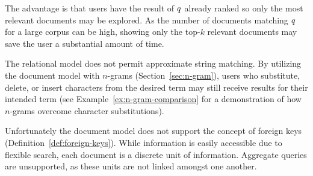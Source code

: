 		The advantage is that users have the result of $q$ already ranked so only the most relevant documents may be explored.  As the number of documents matching $q$ for a large corpus can be high, showing only the top-$k$ relevant documents may save the user a substantial amount of time.
		
		The relational model does not permit approximate string matching.  By utilizing the document model with $n$-grams (Section~\ref{sec:n-gram}), users who substitute, delete, or insert characters from the desired term may still receive results for their intended term (see Example~\ref{ex:n-gram-comparison} for a demonstration of how $n$-grams overcome character substitutions).
		
		Unfortunately the document model does not support the concept of foreign keys (Definition~\ref{def:foreign-keys}).  While information is easily accessible due to flexible search, each document is a discrete unit of information.  Aggregate queries are unsupported, as these units are not linked amongst one another.
